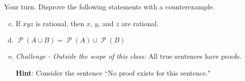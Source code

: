 \documentclass[12pt,letterpaper]{article}
\newcommand\Pow{\ensuremath{\operatorname{\mathcal{P}}}}
\newcommand\hint[1]{\textbf{Hint}: #1}
\newif\ifsol
\begin{document}
      Your turn. Disprove the following statements with a counterexample.
      \begin{enumerate}[a.]
       \setcounter{enumi}{2}

        \item If $xyz$ is rational, then $x$, $y$, and $z$ are rational.

        \begin{mdframed}
		\ifsol
		Consider $x = \sqrt{2}$, $y = \sqrt{3}$, $z = \sqrt{6}$. $xyz = 6$ which is rational.
		\else
        \vspace{4cm}
		\fi
        \end{mdframed}

        \item $\Pow{(A\cup B)} = \Pow{(A)}\cup \Pow{(B)}$

        \begin{mdframed}
		\ifsol
		Consider $A = \{1\}$ and $B = \{2\}$. 

		Then $\{1,2\} \in \Pow{(A\cup B)}$ but $\{1,2\} \not\in \Pow{(A)}\cup \Pow{(B)}$.
		\else
        \vspace{4cm}
		\fi
        \end{mdframed}

        \item \textit{Challenge - Outside the scope of this class:} All true sentences have proofs. 

        \hint{Consider the sentence ``No proof exists for this sentence."}

        \begin{mdframed}
		\ifsol

		\textbf{No proof exists for the sentence:}

		If a proof existed for the sentence ``No proof exists for this sentence" then the sentence would be true. Thereofre, no proof would exist for it. This is a contradiction. 

		\textbf{The sentence is true:}

	If the sentence were false then a proof would exist for the sentence and the sentence would therefore be true. This is also a contradiction. 

		\textbf{Conclusion:}

	We have therefore shown that there are no proofs for the sentence but the sentence is true.
		\else
        \vspace{6cm}
		\fi
        \end{mdframed}

      \end{enumerate}
\end{document}
